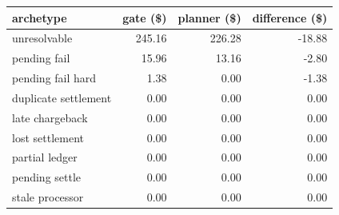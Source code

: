 \begin{tabular}{lrrr}
\toprule
archetype & gate (\$) & planner (\$) & difference (\$) \\
\midrule
unresolvable & 245.16 & 226.28 & -18.88 \\
pending fail & 15.96 & 13.16 & -2.80 \\
pending fail hard & 1.38 & 0.00 & -1.38 \\
duplicate settlement & 0.00 & 0.00 & 0.00 \\
late chargeback & 0.00 & 0.00 & 0.00 \\
lost settlement & 0.00 & 0.00 & 0.00 \\
partial ledger & 0.00 & 0.00 & 0.00 \\
pending settle & 0.00 & 0.00 & 0.00 \\
stale processor & 0.00 & 0.00 & 0.00 \\
\bottomrule
\end{tabular}
